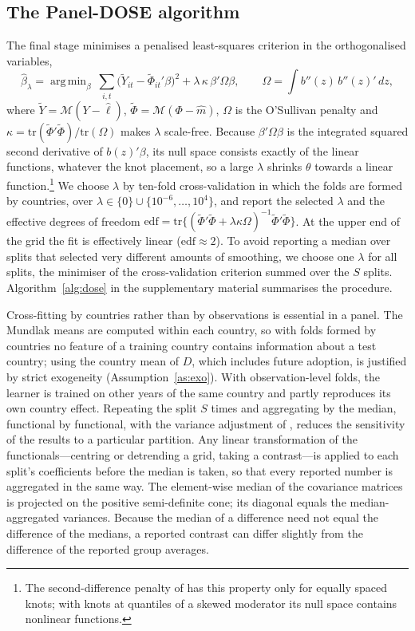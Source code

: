 \documentclass[pdflatex,sn-basic]{sn-jnl}%
\theoremstyle{thmstyleone}
\theoremstyle{thmstyletwo}
\newcommand{\M}{\mathcal{M}}
\DeclareMathOperator*{\argmin}{arg\,min}
\begin{document}
\subsection{The Panel-DOSE algorithm}

The final stage minimises a penalised least-squares criterion in the orthogonalised variables,
\begin{equation}
\hat\beta_\lambda=\argmin_\beta \ \sum_{i,t}\big(\tilde Y_{it}-\tilde\Phi_{it}'\beta\big)^2+\lambda\,\kappa\,\beta'\Omega\beta,\qquad \Omega=\int b''(z)\,b''(z)'\,dz,
\label{eq:pls}
\end{equation}
where $\tilde Y=\M(Y-\hat\ell)$, $\tilde\Phi=\M(\Phi-\hat m)$, $\Omega$ is the O'Sullivan penalty \citep{osullivan1986,wand2008osullivan} and $\kappa=\mathrm{tr}(\tilde\Phi'\tilde\Phi)/\mathrm{tr}(\Omega)$ makes $\lambda$ scale-free. Because $\beta'\Omega\beta$ is the integrated squared second derivative of $b(z)'\beta$, its null space consists exactly of the linear functions, whatever the knot placement, so a large $\lambda$ shrinks $\theta$ towards a linear function.\footnote{The second-difference penalty of \citet{eilers1996} has this property only for equally spaced knots; with knots at quantiles of a skewed moderator its null space contains nonlinear functions.} We choose $\lambda$ by ten-fold cross-validation in which the folds are formed by countries, over $\lambda\in\{0\}\cup\{10^{-6},\dots,10^{4}\}$, and report the selected $\lambda$ and the effective degrees of freedom $\mathrm{edf}=\mathrm{tr}\{(\tilde\Phi'\tilde\Phi+\lambda\kappa\Omega)^{-1}\tilde\Phi'\tilde\Phi\}$. At the upper end of the grid the fit is effectively linear ($\mathrm{edf}\approx2$). To avoid reporting a median over splits that selected very different amounts of smoothing, we choose one $\lambda$ for all splits, the minimiser of the cross-validation criterion summed over the $S$ splits. Algorithm~\ref{alg:dose} in the supplementary material summarises the procedure.

Cross-fitting by countries rather than by observations is essential in a panel. The Mundlak means are computed within each country, so with folds formed by countries no feature of a training country contains information about a test country; using the country mean of $D$, which includes future adoption, is justified by strict exogeneity (Assumption~\ref{as:exo}). With observation-level folds, the learner is trained on other years of the same country and partly reproduces its own country effect. Repeating the split $S$ times and aggregating by the median, functional by functional, with the variance adjustment of \citet{chernozhukov2018dml}, reduces the sensitivity of the results to a particular partition. Any linear transformation of the functionals---centring or detrending a grid, taking a contrast---is applied to each split's coefficients before the median is taken, so that every reported number is aggregated in the same way. The element-wise median of the covariance matrices is projected on the positive semi-definite cone; its diagonal equals the median-aggregated variances. Because the median of a difference need not equal the difference of the medians, a reported contrast can differ slightly from the difference of the reported group averages.
\end{document}
